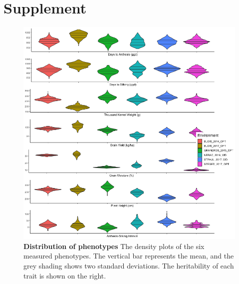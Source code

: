 \documentclass[article,9pt,twocolumn,twoside]{rilabRxiv}
\begin{document}
\section*{Supplement}
\begin{figure}[ht]
\centering
\includegraphics[width=\linewidth]{figures/Methods_Fig2_violinplot.png}
\caption{\textbf{Distribution of phenotypes} The density plots of the six measured phenotypes. The vertical bar represents the mean, and the grey shading shows two standard deviations. The heritability of each trait is shown on the right.}
\label{fig:supfigure1}
\end{figure}
\end{document}
